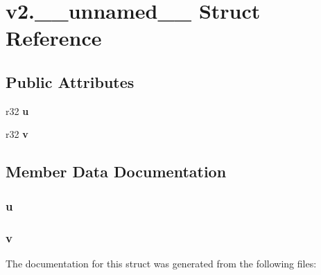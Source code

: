 \hypertarget{structv2_8____unnamed____}{}\section{v2.\+\_\+\+\_\+unnamed\+\_\+\+\_\+ Struct Reference}
\label{structv2_8____unnamed____}
\subsection*{Public Attributes}
\begin{DoxyCompactItemize}
\item 
\mbox{\label{structv2_8____unnamed_____a7b774effe4a349c6dd82ad4f4f21d34c}} 
r32 {\bfseries u}
\item 
\mbox{\label{structv2_8____unnamed_____a9e3669d19b675bd57058fd4664205d2a}} 
r32 {\bfseries v}
\end{DoxyCompactItemize}


\subsection{Member Data Documentation}
\mbox{\label{structv2_8____unnamed_____a7b774effe4a349c6dd82ad4f4f21d34c}} 
\subsubsection{\texorpdfstring{u}{u}}
{\footnotesize\ttfamily }

\mbox{\label{structv2_8____unnamed_____a9e3669d19b675bd57058fd4664205d2a}} 
\subsubsection{\texorpdfstring{v}{v}}
{\footnotesize\ttfamily }



The documentation for this struct was generated from the following files\+: